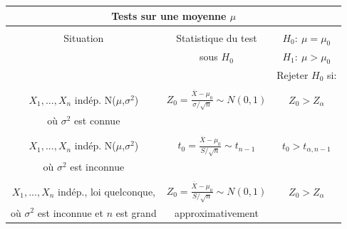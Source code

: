 \documentclass [12pt]{article}
\begin{document}
\vspace*{-0.2 in}
\begin{center}
\begin{tabular}{|c|c|c|}
\hline \multicolumn{3}{|c|}{{\bf Tests sur une moyenne $\mu$}}
\\
\hline &&\\Situation & Statistique du test& $H_{0}:\  \mu =
\mu_{0}$
\\
& sous $H_{0}$  & $H_{1}:\  \mu > \mu_{0}$
\\
& & Rejeter $H_{0}$ si:
\\\hline \hline & &
 \\
$ X_1,...,X_n$ indép. N($\mu$,$\sigma^2$) & $\displaystyle
Z_{0}=\frac{{\overline X} - \mu_{0}}{\sigma /\sqrt{n}} \sim
N(0,1)$ & $Z_{0}>Z_{\alpha}$
\\
où $\sigma^{2}$ est connue &  &
\\
\hline & &
\\
$ X_1,...,X_n$ indép. N($\mu$,$\sigma^2$) & $\displaystyle
t_{0}=\frac{{\overline X} - \mu_{0}}{S / \sqrt{n}}\sim t_{n-1}$ &
$t_{0}>t_{\alpha ,n-1}$
\\
où $\sigma^{2}$ est inconnue& &
\\
\hline
&  &
\\
$ X_1,...,X_n$ indép., loi quelconque, & $\displaystyle
Z_{0}=\frac{{\overline X} - \mu_{0}}{S / \sqrt{n}}\sim N(0,1)$ &
$Z_{0}>Z_{\alpha}$
\\
où $\sigma^{2}$ est inconnue et $n$ est grand &
approximativement &
\\
\hline
\end{tabular}
\end{center}
\end{document}
